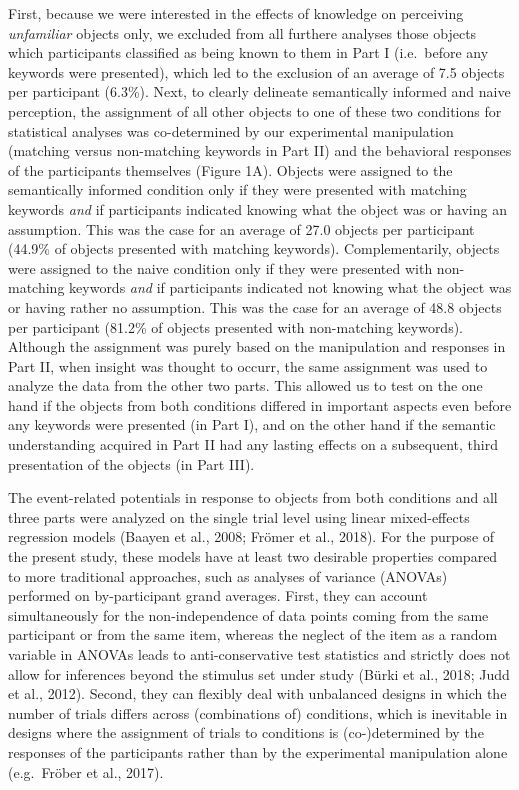 \documentclass[
  english,
  man,11pt,floatsintext]{apa7}
\begin{document}
First, because we were interested in the effects of knowledge on perceiving \emph{unfamiliar} objects only, we excluded from all furthere analyses those objects which participants classified as being known to them in Part I (i.e.~before any keywords were presented), which led to the exclusion of an average of 7.5 objects per participant (6.3\%). Next, to clearly delineate semantically informed and naive perception, the assignment of all other objects to one of these two conditions for statistical analyses was co-determined by our experimental manipulation (matching versus non-matching keywords in Part II) and the behavioral responses of the participants themselves (Figure 1A). Objects were assigned to the semantically informed condition only if they were presented with matching keywords \emph{and} if participants indicated knowing what the object was or having an assumption. This was the case for an average of 27.0 objects per participant (44.9\% of objects presented with matching keywords). Complementarily, objects were assigned to the naive condition only if they were presented with non-matching keywords \emph{and} if participants indicated not knowing what the object was or having rather no assumption. This was the case for an average of 48.8 objects per participant (81.2\% of objects presented with non-matching keywords). Although the assignment was purely based on the manipulation and responses in Part II, when insight was thought to occurr, the same assignment was used to analyze the data from the other two parts. This allowed us to test on the one hand if the objects from both conditions differed in important aspects even before any keywords were presented (in Part I), and on the other hand if the semantic understanding acquired in Part II had any lasting effects on a subsequent, third presentation of the objects (in Part III).

The event-related potentials in response to objects from both conditions and all three parts were analyzed on the single trial level using linear mixed-effects regression models (Baayen et al., 2008; Frömer et al., 2018). For the purpose of the present study, these models have at least two desirable properties compared to more traditional approaches, such as analyses of variance (ANOVAs) performed on by-participant grand averages. First, they can account simultaneously for the non-independence of data points coming from the same participant or from the same item, whereas the neglect of the item as a random variable in ANOVAs leads to anti-conservative test statistics and strictly does not allow for inferences beyond the stimulus set under study (Bürki et al., 2018; Judd et al., 2012). Second, they can flexibly deal with unbalanced designs in which the number of trials differs across (combinations of) conditions, which is inevitable in designs where the assignment of trials to conditions is (co-)determined by the responses of the participants rather than by the experimental manipulation alone (e.g.~Fröber et al., 2017).
\end{document}
